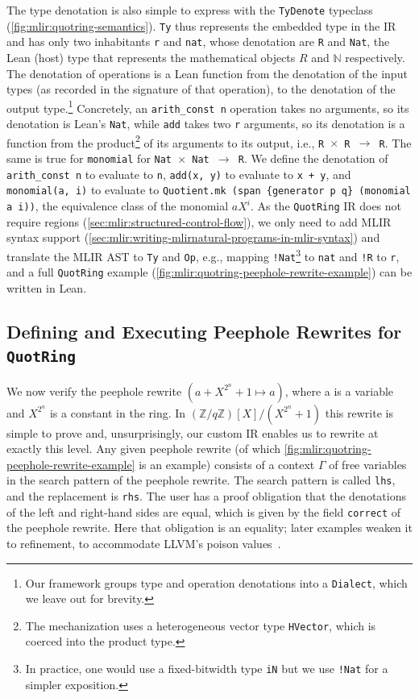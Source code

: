 The type denotation is also simple to express with the \texttt{TyDenote} typeclass (\cref{fig:mlir:quotring-semantics}).
\texttt{Ty} thus represents the embedded type in the IR and has only two inhabitants \texttt{r} and \texttt{nat}, whose denotation are \texttt{R} and \texttt{Nat}, the Lean (host) type that represents the mathematical objects $R$ and $\mathbb{N}$ respectively.
The denotation of operations is a Lean function from the denotation of the input types (as recorded in the signature of that operation), to the denotation of the output type.\footnote{Our framework groups type and operation denotations into a \texttt{Dialect}, which we leave out for brevity.}
Concretely, an \texttt{arith\_const n} operation takes no arguments, so its denotation is Lean's \texttt{Nat}, while \texttt{add} takes two \texttt{r} arguments, so its denotation is a function from the product\footnote{The mechanization uses a heterogeneous vector type \texttt{HVector}, which is coerced into the product type.} of its arguments to its output, i.e., \texttt{R $\times$ R $\rightarrow$ R}.
The same is true for \texttt{monomial} for \texttt{Nat $\times$ Nat $\rightarrow$ R}.
We define the denotation of  \texttt{arith\_const n} to evaluate to \texttt{n}, \texttt{add(x, y)} to evaluate to \texttt{x~+~y}, and \texttt{monomial(a, i)} to evaluate to \texttt{Quotient.mk (span \{generator p q\} (monomial a i))}, the equivalence class of the monomial $a X^i$.
As the \texttt{QuotRing} IR does not require regions (\cref{sec:mlir:structured-control-flow}), we only need to add MLIR syntax support (\cref{sec:mlir:writing-mlirnatural-programs-in-mlir-syntax}) and translate the MLIR AST to \texttt{Ty} and \texttt{Op}, e.g., mapping \texttt{!Nat}\footnote{In practice, one would use a fixed-bitwidth type \texttt{iN} but we use \texttt{!Nat} for a simpler exposition.} to \texttt{nat} and \texttt{!R} to \texttt{r}, and a full \texttt{QuotRing} example (\cref{fig:mlir:quotring-peephole-rewrite-example}) can be written in Lean.

\subsection{Defining and Executing Peephole Rewrites for \texttt{QuotRing}}
\label{sec:mlir:rewriter}

We now verify the peephole rewrite $(a + X^{2^n} + 1 \mapsto a)$, where a is a variable and $X^{2^n}$ is a constant in the ring.
In $(\mathbb{Z}/q\mathbb{Z})[X] / (X^{2^n} + 1)$ this rewrite is simple to prove and, unsurprisingly, our custom  IR enables us to rewrite at exactly this level.
Any given peephole rewrite (of which \cref{fig:mlir:quotring-peephole-rewrite-example} is an example) consists of a context $\Gamma$ of free variables in the search pattern of the peephole rewrite.
The search pattern is called \texttt{lhs}, and the replacement is \texttt{rhs}.
The user has a proof obligation that the denotations of the left and right-hand sides are equal, which is given by the field \texttt{correct} of the peephole rewrite.
Here that obligation is an equality; later examples weaken it to refinement, to
accommodate LLVM's poison values~\cite{lee2017taming}.

